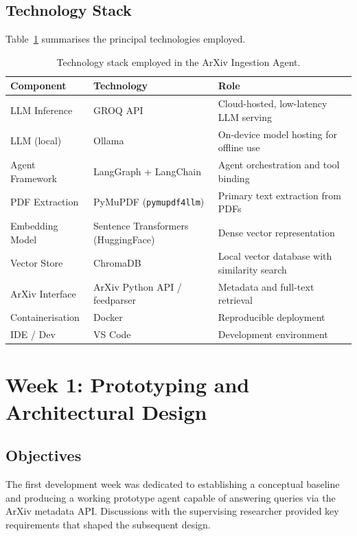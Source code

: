 \documentclass[12pt, a4paper]{article}
\begin{document}
\subsection{Technology Stack}

Table~\ref{tab:stack} summarises the principal technologies employed.

\begin{table}[H]
    \centering
    \caption{Technology stack employed in the ArXiv Ingestion Agent.}
    \label{tab:stack}
    \begin{tabularx}{\linewidth}{@{}l l X@{}}
        \toprule
        \textbf{Component} & \textbf{Technology} & \textbf{Role} \\
        \midrule
        LLM Inference & GROQ API & Cloud-hosted, low-latency LLM serving \\
        LLM (local) & Ollama & On-device model hosting for offline use \\
        Agent Framework & LangGraph + LangChain & Agent orchestration and tool binding \\
        PDF Extraction & PyMuPDF (\texttt{pymupdf4llm}) & Primary text extraction from PDFs \\
        Embedding Model & Sentence Transformers (HuggingFace) & Dense vector representation \\
        Vector Store & ChromaDB & Local vector database with similarity search \\
        ArXiv Interface & ArXiv Python API / feedparser & Metadata and full-text retrieval \\
        Containerisation & Docker & Reproducible deployment \\
        IDE / Dev & VS Code & Development environment \\
        \bottomrule
    \end{tabularx}
\end{table}

\section{Week 1: Prototyping and Architectural Design}
\label{sec:week1}

\subsection{Objectives}

The first development week was dedicated to establishing a conceptual
baseline and producing a working prototype agent capable of answering
queries via the ArXiv metadata API. Discussions with the supervising
researcher provided key requirements that shaped the subsequent design.
\end{document}
